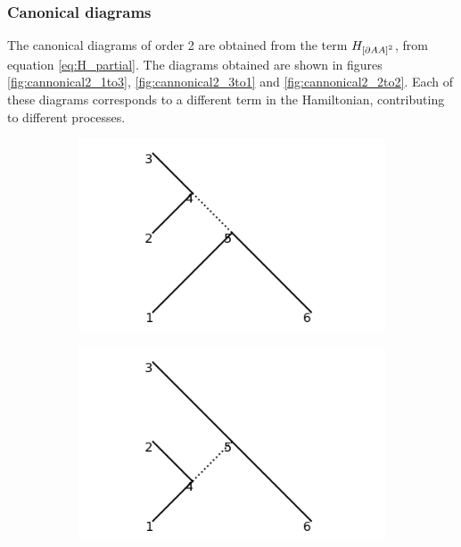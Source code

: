 \documentclass[11pt,a4paper,twoside,pdf]{article}
\numberwithin{equation}{section}
\begin{document}
\subsubsection{Canonical diagrams}

The canonical diagrams of order 2 are obtained from the term 
$H_{\left[ \partial A A \right]^2}$, from equation \eqref{eq:H_partial}. The
diagrams obtained are shown in figures \ref{fig:cannonical2_1to3},
\ref{fig:cannonical2_3to1} and \ref{fig:cannonical2_2to2}. Each of these diagrams
corresponds to a different term in the Hamiltonian, contributing to different processes.

\begin{figure}[h!]
    \centering
    \begin{subfigure}[t]{0.33\textwidth}
        \centering
        \includegraphics[width=\textwidth]{plots/canonical/order2/1.png}
        \caption{ }
    \end{subfigure}%
    \begin{subfigure}[t]{0.33\textwidth}
        \centering
        \includegraphics[width=\textwidth]{plots/canonical/order2/2.png}

\end{subfigure}
\end{figure}
\end{document}
